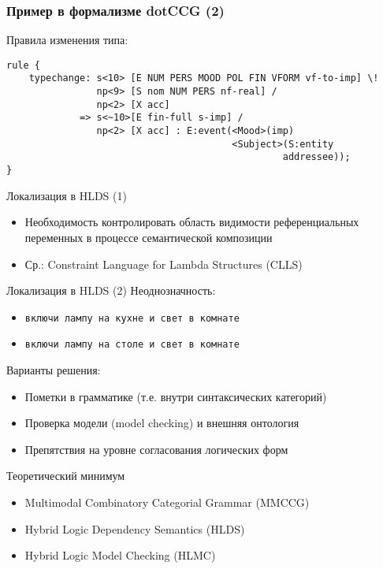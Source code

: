 \documentclass{beamer}
\begin{document}
\begin{frame}[fragile]
\frametitle{Пример в формализме dotCCG (2)}
Правила изменения типа:
{\footnotesize \begin{verbatim}
rule {
    typechange: s<10> [E NUM PERS MOOD POL FIN VFORM vf-to-imp] \! 
                np<9> [S nom NUM PERS nf-real] / 
                np<2> [X acc]
             => s<~10>[E fin-full s-imp] / 
                np<2> [X acc] : E:event(<Mood>(imp) 
                                        <Subject>(S:entity 
                                                 addressee));
}
\end{verbatim}}
\end{frame}


\begin{frame}{Локализация в HLDS (1)}
\begin{itemize}
	\item Необходимость контролировать область видимости референциальных переменных в процессе семантической композиции
	\item Ср.: Constraint Language for Lambda Structures (CLLS)
\end{itemize}
\end{frame}

\begin{frame}{Локализация в HLDS (2)}
Неоднозначность:
\begin{itemize}
	\item \texttt{включи лампу на кухне и свет в комнате}
	\item \texttt{включи лампу на столе и свет в комнате}
\end{itemize}
\bigskip
Варианты решения:
\begin{itemize}
	\item Пометки в грамматике (т.е. внутри синтаксических категорий)
	\item Проверка модели (model checking) и внешняя онтология
	\item Препятствия на уровне согласования логических форм
\end{itemize}
\end{frame}





\begin{frame}{Теоретический минимум}
\begin{itemize}
	\item Multimodal Combinatory Categorial Grammar (MMCCG)
	\item Hybrid Logic Dependency Semantics (HLDS)
	\item Hybrid Logic Model Checking (HLMC)
\end{itemize}
\end{frame}
\end{document}

